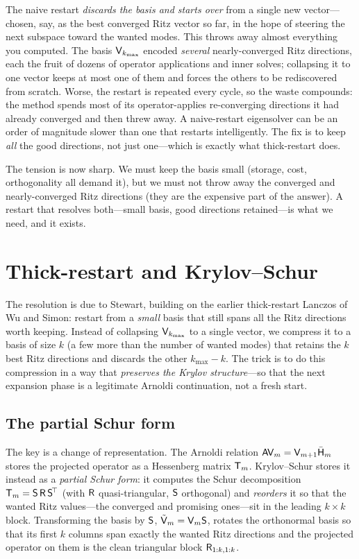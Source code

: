 \begin{pitfall}
The naive restart \emph{discards the basis and starts over} from a single new vector---chosen,
say, as the best converged Ritz vector so far, in the hope of steering the next subspace toward
the wanted modes. This throws away almost everything you computed. The basis $\mathsf{V}_{k_{\max}}$
encoded \emph{several} nearly-converged Ritz directions, each the fruit of dozens of operator
applications and inner solves; collapsing it to one vector keeps at most one of them and forces
the others to be rediscovered from scratch. Worse, the restart is repeated every cycle, so the
waste compounds: the method spends most of its operator-applies re-converging directions it had
already converged and then threw away. A naive-restart eigensolver can be an order of magnitude
slower than one that restarts intelligently. The fix is to keep \emph{all} the good directions,
not just one---which is exactly what thick-restart does.
\end{pitfall}

The tension is now sharp. We must keep the basis small (storage, cost, orthogonality all demand
it), but we must not throw away the converged and nearly-converged Ritz directions (they are the
expensive part of the answer). A restart that resolves both---small basis, good directions
retained---is what we need, and it exists.

\section{Thick-restart and Krylov--Schur}
\label{sec:thickrestart}

The resolution is due to Stewart, building on the earlier thick-restart Lanczos of Wu and
Simon: restart from a \emph{small} basis that still spans all the Ritz directions worth keeping.
Instead of collapsing $\mathsf{V}_{k_{\max}}$ to a single vector, we compress it to a basis of
size $k$ (a few more than the number of wanted modes) that retains the $k$ best Ritz directions
and discards the other $k_{\max} - k$. The trick is to do this compression in a way that
\emph{preserves the Krylov structure}---so that the next expansion phase is a legitimate Arnoldi
continuation, not a fresh start.

\subsection{The partial Schur form}

The key is a change of representation. The Arnoldi relation $\mathsf{A}\mathsf{V}_m =
\mathsf{V}_{m+1}\bar{\mathsf{H}}_m$ stores the projected operator as a Hessenberg matrix $\mathsf{T}_m$.
Krylov--Schur stores it instead as a \emph{partial Schur form}: it computes the Schur
decomposition $\mathsf{T}_m = \mathsf{S}\,\mathsf{R}\,\mathsf{S}^{\!\top}$ (with $\mathsf{R}$ quasi-triangular,
$\mathsf{S}$ orthogonal) and \emph{reorders} it so that the wanted Ritz values---the converged and
promising ones---sit in the leading $k \times k$ block. Transforming the basis by $\mathsf{S}$,
$\tilde{\mathsf{V}}_m = \mathsf{V}_m\mathsf{S}$, rotates the orthonormal basis so that its first $k$
columns span exactly the wanted Ritz directions and the projected operator on them is the clean
triangular block $\mathsf{R}_{1:k,1:k}$.


